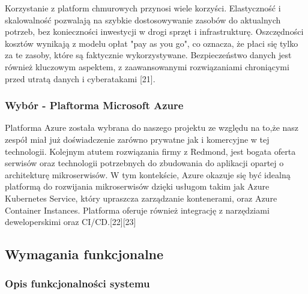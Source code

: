 Korzystanie z platform chmurowych przynosi wiele korzyści. Elastyczność i skalowalność pozwalają na szybkie dostosowywanie zasobów do aktualnych potrzeb, bez konieczności inwestycji w drogi sprzęt i infrastrukturę. Oszczędności kosztów wynikają z modelu opłat "pay as you go", co oznacza, że płaci się tylko za te zasoby, które są faktycznie wykorzystywane. Bezpieczeństwo danych jest również kluczowym aspektem, z zaawansowanymi rozwiązaniami chroniącymi przed utratą danych i cyberatakami [21].

\subsubsection{Wybór - Plaftorma Microsoft Azure}
Platforma Azure została wybrana do naszego projektu ze względu na to,że nasz zespół miał już doświadczenie zarówno prywatne jak i komercyjne w tej technologii. Kolejnym atutem rozwiązania firmy z Redmond, jest bogata oferta serwisów oraz technologii potrzebnych do zbudowania do aplikacji opartej o architekturę mikroserwisów.
W tym kontekście, Azure okazuje się być idealną platformą do rozwijania mikroserwisów dzięki usługom takim jak Azure Kubernetes Service, który upraszcza zarządzanie kontenerami, oraz Azure Container Instances. Platforma oferuje również integrację z narzędziami deweloperskimi oraz CI/CD.[22][23]

\clearpage

\subsection{Wymagania funkcjonalne}

\subsubsection{Opis funkcjonalności systemu}

